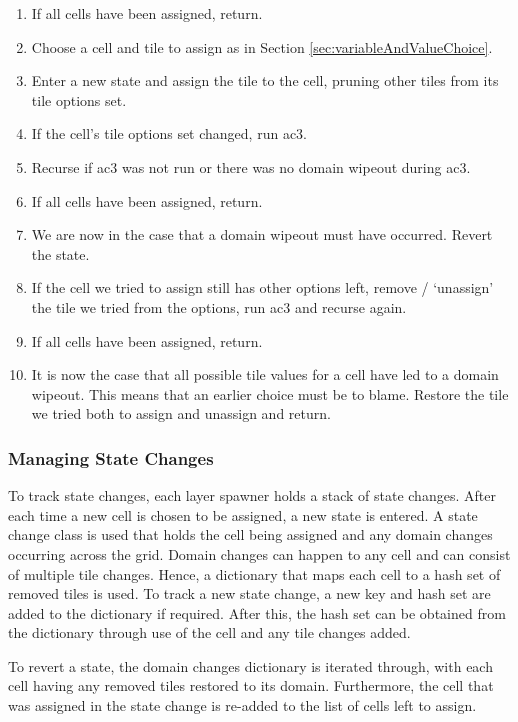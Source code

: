 \begin{enumerate}
    \item If all cells have been assigned, return.
    \item Choose a cell and tile to assign as in Section \ref{sec:variableAndValueChoice}.
    \item Enter a new state and assign the tile to the cell, pruning other tiles from its tile options set.
    \item If the cell's tile options set changed, run \acrshort{ac3}.
    \item Recurse if \acrshort{ac3} was not run or there was no domain wipeout during \acrshort{ac3}.
    \item If all cells have been assigned, return.
    \item We are now in the case that a domain wipeout must have occurred. Revert the state.
    \item If the cell we tried to assign still has other options left, remove / `unassign' the tile we tried from the options, run \acrshort{ac3} and recurse again.
    \item If all cells have been assigned, return.
    \item It is now the case that all possible tile values for a cell have led to a domain wipeout. This means that an earlier choice must be to blame. Restore the tile we tried both to assign and unassign and return.
\end{enumerate}

\subsubsection{Managing State Changes}
To track state changes, each layer spawner holds a stack of state changes. After each time a new cell is chosen to be assigned, a new state is entered. A state change class is used that holds the cell being assigned and any domain changes occurring across the grid. Domain changes can happen to any cell and can consist of multiple tile changes. Hence, a dictionary that maps each cell to a hash set of removed tiles is used. To track a new state change, a new key and hash set are added to the dictionary if required. After this, the hash set can be obtained from the dictionary through use of the cell and any tile changes added.


To revert a state, the domain changes dictionary is iterated through, with each cell having any removed tiles restored to its domain. Furthermore, the cell that was assigned in the state change is re-added to the list of cells left to assign.

